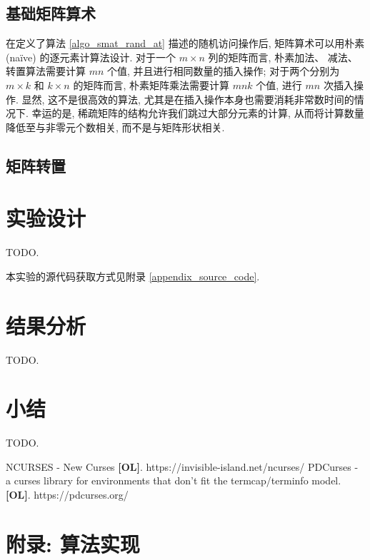 \subsection{基础矩阵算术}

在定义了算法 \ref{algo_smat_rand_at} 描述的随机访问操作后, 矩阵算术可以用朴素 (na\"{i}ve) 的逐元素计算法设计. 对于一个 $m \times n$ 列的矩阵而言, 朴素加法、 减法、 转置算法需要计算 $mn$ 个值, 并且进行相同数量的插入操作; 对于两个分别为 $m \times k$ 和 $k \times n$ 的矩阵而言, 朴素矩阵乘法需要计算 $mnk$ 个值, 进行 $mn$ 次插入操作. 显然, 这不是很高效的算法, 尤其是在插入操作本身也需要消耗非常数时间的情况下. 幸运的是, 稀疏矩阵的结构允许我们跳过大部分元素的计算, 从而将计算数量降低至与非零元个数相关, 而不是与矩阵形状相关.



\subsection{矩阵转置}

\section{实验设计}

TODO.

本实验的源代码获取方式见附录 \ref{appendix_source_code}.

\section{结果分析}

TODO.

\section{小结}

TODO.

\begin{thebibliography}{}

 NCURSES - New Curses \textbf{[OL]}. https://invisible-island.net/ncurses/
 PDCurses - a curses library for environments that don't fit the termcap/terminfo model. \textbf{[OL]}. https://pdcurses.org/

\end{thebibliography}

\appendix

\section{附录: 算法实现}

